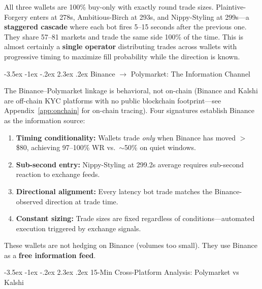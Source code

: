 \documentclass[11pt,a4paper]{article}
\makeatletter
\renewcommand\section{\@startsection{section}{1}{\z@}%
  {-3.5ex \@plus -1ex \@minus -.2ex}%
  {2.3ex \@plus .2ex}%
  {\normalfont\Large\bfseries}}
\makeatother
\begin{document}
All three wallets are 100\% buy-only with exactly round trade sizes. Plaintive-Forgery enters at 278s, Ambitious-Birch at 293s, and Nippy-Styling at 299s---a \textbf{staggered cascade} where each bot fires 5--15 seconds after the previous one. They share 57--81 markets and trade the same side 100\% of the time. This is almost certainly a \textbf{single operator} distributing trades across wallets with progressive timing to maximize fill probability while the direction is known.

\section{Binance $\to$ Polymarket: The Information Channel}

The Binance--Polymarket linkage is behavioral, not on-chain (Binance and Kalshi are off-chain KYC platforms with no public blockchain footprint---see Appendix~\ref{app:onchain} for on-chain tracing). Four signatures establish Binance as the information source:

\begin{enumerate}[nosep]
    \item \textbf{Timing conditionality:} Wallets trade \emph{only} when Binance has moved $>$\$80, achieving 97--100\% WR vs.\ $\sim$50\% on quiet windows.
    \item \textbf{Sub-second entry:} Nippy-Styling at 299.2s average requires sub-second reaction to exchange feeds.
    \item \textbf{Directional alignment:} Every latency bot trade matches the Binance-observed direction at trade time.
    \item \textbf{Constant sizing:} Trade sizes are fixed regardless of conditions---automated execution triggered by exchange signals.
\end{enumerate}

These wallets are not hedging on Binance (volumes too small). They use Binance as a \textbf{free information feed}.

\section{15-Min Cross-Platform Analysis: Polymarket vs Kalshi}
\end{document}
